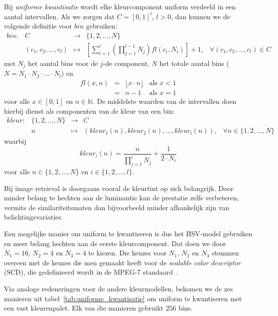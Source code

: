 Bij \emph{uniforme kwantisatie} wordt elke kleurcomponent uniform verdeeld in een 
aantal intervallen. Als we zorgen dat $C=[0,1]^l$, $l > 0$, dan kunnen we de 
volgende definitie voor $bin$ gebruiken: $$
\begin{array}{lrcll}
bin: & C & \to & \{1,2,...,N\}\\[5pt] & (c_1,c_2,\ldots,c_l) & \mapsto & \left[ 
\displaystyle\sum_{i=1}^l \left( \prod_{j=1}^{i-1} N_j \right) \mathit{fl}(c_i, N_i) \right] 
+ 1, & \forall (c_1,c_2,\ldots,c_l) \in C
\end{array}
$$ met $N_j$ het aantal bins voor de $j$-de component, $N$ het totale aantal 
bins ($N=N_1 \cdot N_2 \cdot \ldots \cdot N_l$) en $$
\begin{array}{rcll}
\mathit{fl}(x,n) & = & \lfloor x \cdot n \rfloor & \textrm{als } x < 1 \\ & = & 
n - 1 & \textrm{als } x = 1
\end{array}
$$ voor alle $x \in [0,1]$ en $n \in \mathbb{N}$. De middelste waarden van de 
intervallen doen hierbij dienst als componenten van de kleur van een bin: $$
\begin{array}{lrcll}
kleur: & \{1,2,\ldots,N\} & \to & C \\ & n & \mapsto & (kleur_1(n), kleur_2(n), 
\dots, kleur_l(n)), & \forall n \in \{1,2,\ldots,N\}
\end{array}
$$ waarbij $$ kleur_i(n) = \frac{n}{\prod_{j=1}^i N_j} + \frac{1}{2 \cdot N_i} 
$$ voor alle $n \in \{1,2,\ldots,N\}$ en $i \in \{1,2,\ldots,l\}$.

Bij image retrieval is doorgaans vooral de kleurtint op zich belangrijk. Door
minder belang te hechten aan de luminantie kan de prestatie zelfs verbeteren,
vermits de similariteitsmaten dan bijvoorbeeld minder afhankelijk zijn van
belichtingsvariaties. 

Een mogelijke manier om uniform te kwantiseren is dus
het HSV-model gebruiken en meer belang hechten aan de eerste kleurcomponent. 
Dat doen we door $N_1=16$, $N_2=4$ en $N_3=4$ te kiezen.
Die keuzes voor $N_1$, $N_2$ en $N_3$ stemmen overeen met de keuzes die men 
gemaakt heeft voor de \emph{scalable color descriptor} (SCD), die gedefinieerd 
wordt in de MPEG-7 standaard \cite{manjunath:color_and_texture_descriptors}.

Via analoge redeneringen voor de andere kleurmodellen, bekomen we de zes manieren 
uit tabel~\ref{tab:uniforme_kwantisatie} om uniform te kwantiseren met een vast kleurenpalet.
Elk van die manieren gebruikt $256$ bins.

